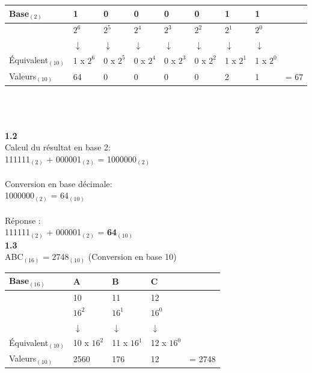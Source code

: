 \begin{Exercice}[20 minutes]
\begin{solution}
        \begin{tabular}{| C{0.15\textwidth} | C{0.07\textwidth} | C{0.07\textwidth} | C{0.07\textwidth} | C{0.07\textwidth} | C{0.07\textwidth} | C{0.07\textwidth} | C{0.07\textwidth} | C{0.06\textwidth} |} 
            \hline
            Base$_{(2)}$ & \textbf{1} & \textbf{0} & \textbf{0} & \textbf{0} & \textbf{0} & \textbf{1} & \textbf{1} & \textbf{}\\ [0.5ex]
            \hline
             & $2^6$ & $2^5$ & $2^4$ & $2^3$ & $2^2$ & $2^1$ & $2^0$ & \\ [0.5ex] 
            \hline
             & $\downarrow$ & $\downarrow$ & $\downarrow$ & $\downarrow$ & $\downarrow$ & $\downarrow$ & $\downarrow$ & \\ [0.5ex] 
            \hline
            Équivalent$_{(10)}$ & 1 x $2^6$ & 0 x $2^5$ & 0 x $2^4$ & 0 x $2^3$ & 0 x $2^2$ & 1 x $2^1$ & 1 x $2^0$ & \\ [0.5ex]     
            \hline
            Valeurs$_{(10)}$ & 64 & 0 & 0 & 0 & 0 & 2 & 1 & = 67 \\ [0.5ex]
            \hline
        \end{tabular}
        \\\\\\
        \textbf{1.2}\\
        Calcul du résultat en base 2:\\
        111111$_{(2)}$ + 000001$_{(2)}$ = 1000000$_{(2)}$\\\\
        Conversion en base décimale:\\
        1000000$_{(2)}$ = 64$_{(10)}$\\\\
        Réponse :\\
        111111$_{(2)}$ + 000001$_{(2)}$ = \textbf{64$_{(10)}$}\\
        
        \textbf{1.3}\\
        ABC$_{(16)}$ = 2748$_{(10)}$ (Conversion en base 10)\\
        \begin{tabular}{| C{0.15\textwidth} | C{0.08\textwidth} | C{0.08\textwidth} | C{0.08\textwidth} | C{0.08\textwidth} |} 
            \hline
            Base$_{(16)}$ & \textbf{A} & \textbf{B} & \textbf{C} & \textbf{}\\ [0.5ex]
            \hline
             & 10 & 11 & 12 & \\ [0.5ex]
             \hline
             & $16^2$ & $16^1$ & $16^0$ & \\ [0.5ex] 
            \hline
             & $\downarrow$ & $\downarrow$ & $\downarrow$ & \\ [0.5ex] 
            \hline
            Équivalent$_{(10)}$ & 10 x $16^2$ & 11 x $16^1$ & 12 x $16^0$ &\\ [0.5ex]     
            \hline
            Valeurs$_{(10)}$ & 2560 & 176 & 12 & = 2748 \\ [0.5ex]
            \hline
        \end{tabular}
        

\end{solution}
\end{Exercice}
